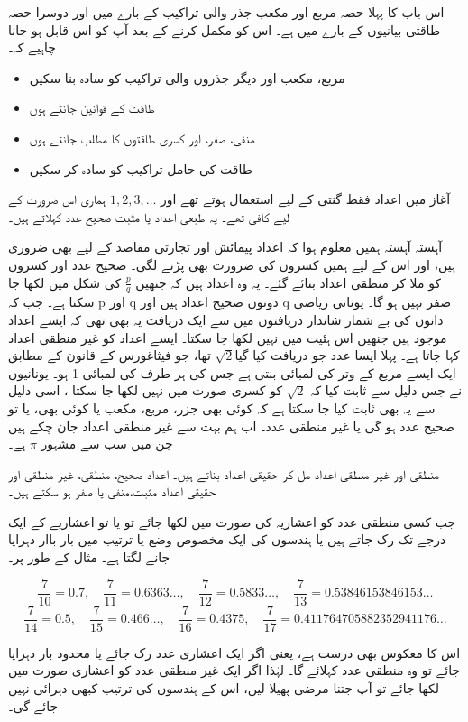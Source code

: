 
اس باب کا پہلا حصہ مربع اور مکعب جذر والی تراکیب کے بارے میں اور دوسرا حصہ طاقتی بیانیوں کے بارے میں ہے۔ اس کو مکمل کرنے کے بعد آپ کو اس قابل ہو جانا چاہیے کہ۔ 
\begin{itemize}
\item
مربع، مکعب اور دیگر جذروں والی تراکیب کو سادہ بنا سکیں
\item
طاقت کے قوانین جانتے ہوں
\item
منفی، صفر، اور کسری طاقتوں کا مطلب جانتے ہوں
\item
طاقت کی حامل تراکیب کو سادہ کر سکیں
\end{itemize}
آغاز میں اعداد فقط گنتی کے لیے استعمال ہوتے تھے اور \(1,2,3,\dotsc\) ہماری اس ضرورت کے لیے کافی تھے۔ یہ طبعی اعداد یا مثبت صحیح عدد کہلاتے ہیں۔ 

آہستہ آہستہ ہمیں معلوم ہوا کہ اعداد پیمائش اور تجارتی مقاصد کے لیے بھی ضروری ہیں، اور اس کے لیے ہمیں کسروں کی ضرورت بھی پڑنے لگی۔ صحیح عدد اور کسروں کو ملا کر منطقی اعداد بنائے گئے۔ یہ وہ اعداد ہیں کہ جنھیں \(\frac{p}{q}\) کی شکل میں لکھا جا سکتا ہے۔ جب کہ p اور q  دونوں صحیح اعداد ہیں اور q صفر نہیں ہو گا۔
یونانی ریاضی دانوں کی بے شمار شاندار دریافتوں میں سے ایک دریافت یہ بھی تھی کہ ایسے اعداد موجود ہیں جنھیں اس ہئیت میں نہیں لکھا جا سکتا۔ ایسے اعداد کو غیر منطقی اعداد کہا جاتا ہے۔ پہلا ایسا عدد جو دریافت کیا گیا\(\sqrt{2}\) تھا، جو فیثاغورس کے قانون کے مطابق ایک ایسے مربع کے وتر کی لمبائی بنتی ہے جس کی ہر طرف کی لمبائی 1 ہو۔ یونانیوں نے جس دلیل سے ثابت کیا کہ \(\sqrt{2}\) کو کسری صورت میں نہیں لکھا جا سکتا ، اسی دلیل سے یہ بھی ثابت کیا جا سکتا ہے کہ کوئی بھی جزر، مربع، مکعب یا کوئی بھی، یا تو صحیح عدد ہو گی یا غیر منطقی عدد۔ اب ہم بہت سے غیر منطقی اعداد جان چکے ہیں جن میں سب سے مشہور \(\pi\) ہے۔

منطقی اور غیر منطقی اعداد مل کر حقیقی اعداد بناتے ہیں۔ اعداد صحیح، منطقی، غیر منطقی اور حقیقی اعداد مثبت،منفی یا صفر ہو سکتے ہیں۔

جب کسی منطقی عدد کو اعشاریہ کی صورت میں لکھا جائے تو یا تو اعشاریے کے ایک درجے تک رک جاتے ہیں یا ہندسوں کی ایک مخصوص وضع یا ترتیب میں  بار باار دہرایا جانے لگتا ہے۔  مثال کے طور پر۔ 

\[\frac{7}{10}=0.7,\quad \frac{7}{11}=0.6363\dotsc,\quad\frac{7}{12}=0.5833\dotsc,\quad\frac{7}{13}=0.538 461 538 461 53\dotsc\]
\[\frac{7}{14}=0.5,\quad\frac{7}{15}=0.466\dotsc,\quad\frac{7}{16}=0.4375,\quad\frac{7}{17}=0.411 764 705 882 352941176\dotsc\]

اس کا معکوس بھی درست ہے، یعنی اگر ایک اعشاری عدد رک جائے یا محدود بار دہرایا جائے تو وہ منطقی عدد کہلائے گا۔ لہٰذا اگر ایک غیر منطقی عدد کو اعشاری صورت میں لکھا جائے تو آپ جتنا مرضی پھیلا لیں، اس کے ہندسوں کی ترتیب کبھی دہرائی نہیں جائے گی۔

